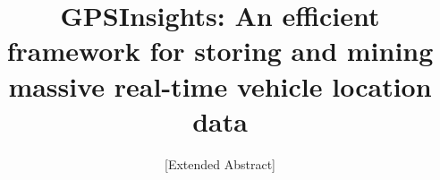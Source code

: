 \documentclass{acm_proc_article-sp}
\begin{document}
\title{GPSInsights: An efficient framework for storing and mining massive real-time vehicle location data}

\subtitle{[Extended Abstract]
}
%
%
%
%
%
\end{document}
